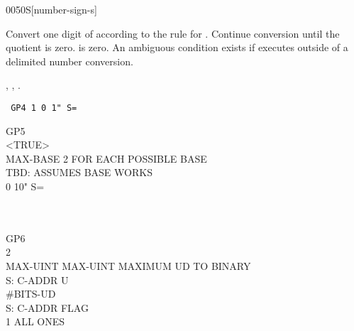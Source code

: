 \begin{worddef}[numS]{0050}{\num{}S}[number-sign-s]
\item {}

	Convert one digit of  according to the rule for
	. Continue conversion until the quotient is zero.
	 is zero. An ambiguous condition exists if
	 executes outside of a  
	delimited number conversion.

\see {},
	,
	.

	\begin{testing} %
		\ttfamily
		\texttt{\word{:} GP4   1 0    1" S= \word{;}} \\

		\word{:} GP5 \\
		\tab {}  <TRUE> \\
		\tab MAX-BASE  2 		\tab[2]  FOR EACH POSSIBLE BASE \\
		\tab[2]   \word{!}	\tab[5.8]  TBD: ASSUMES BASE WORKS \\
		\tab[3]  0     10" S=  \\
		\tab    {} \\
		\tab    {}  \word{!} \word{;} \\

		\word{:} GP6 \\
		\tab	{}    2  \word{!} \\
		\tab	MAX-UINT MAX-UINT   	\tab		{} MAXIMUM UD TO BINARY \\
		\tab	{}  \word{!}								\tab[10.6]	 S: C-ADDR U \\
		\tab	{} \#BITS-UD \word{=}  \\
		 														\tab[13.6]	 S: C-ADDR FLAG \\
		\tab[2]		  \word{[CHAR]} 1 \word{=} 	\tab[1.2]	 ALL ONES \\
		\tab[2]		   \\
		\tab	{}   \word{;} \\


\end{testing}
\end{worddef}
